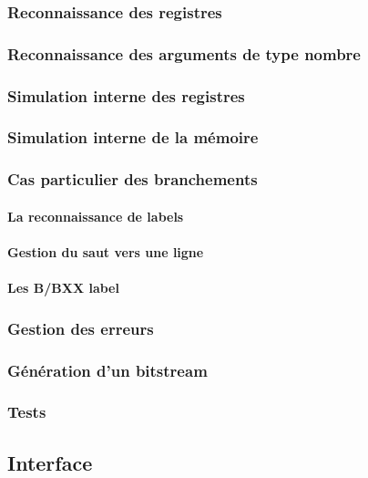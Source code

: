 \documentclass{article}
\begin{document}
\subsubsection{Reconnaissance des registres}
\subsubsection{Reconnaissance des arguments de type nombre}
\subsubsection{Simulation interne des registres}
\subsubsection{Simulation interne de la mémoire}
\subsubsection{Cas particulier des branchements}
\paragraph{La reconnaissance de labels}
\paragraph{Gestion du saut vers une ligne}
\paragraph{Les B/BXX label}
\subsubsection{Gestion des erreurs}
\subsubsection{Génération d'un bitstream}

\subsubsection{Tests}


\paragraph{}


\newpage
\subsection{Interface}
\end{document}
